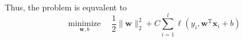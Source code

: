 \documentclass[a4paper]{article}
\begin{document}
\begin{enumerate}
\begin{enumerate}
  Thus, the problem is equvalent to
  \begin{equation*}
    \underset{\boldsymbol{w}, b}{\operatorname{minimize}} \quad \frac{1}{2}\|\boldsymbol{w}\|_{2}^{2}+C \sum_{i=1}^{l} \ell\left(y_{i}, \boldsymbol{w}^{\mathrm{T}} \boldsymbol{x}_{i}+b\right)
  \end{equation*}






\end{enumerate}
\end{enumerate}
\end{document}
